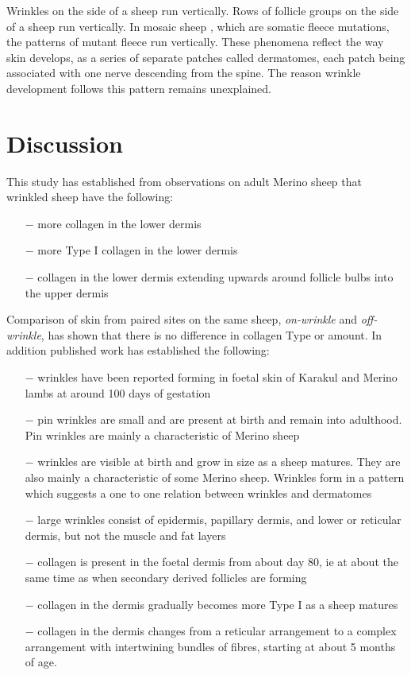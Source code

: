 \documentclass[]{interact}
\theoremstyle{plain}%
\theoremstyle{definition}
\theoremstyle{remark}
\begin{document}
Wrinkles on the side of a sheep run vertically. Rows of follicle groups on the side of a sheep run vertically. In mosaic sheep \citep{fraser-1960}, which are somatic fleece mutations, the patterns of mutant fleece run vertically.  These phenomena reflect the way skin develops, as a series of separate patches called dermatomes, each patch being associated with one nerve descending from the spine. The reason wrinkle development follows this pattern remains unexplained.

\section{Discussion}
This study has established from observations on adult Merino sheep that wrinkled sheep have the following:
\small
\begin{itemize}
\item[$-$] more collagen in the lower dermis
\item[$-$] more Type I collagen in the lower dermis
\item[$-$] collagen in the lower dermis extending upwards around follicle bulbs into the upper dermis
\end{itemize}
\normalsize
Comparison of skin from paired sites on the same sheep,  {\em  on-wrinkle} and {\em off-wrinkle}, has shown that there is no difference in collagen Type or amount.
In addition published work has established the following:
\small
\begin{itemize}
\item[$-$] wrinkles have been reported forming in foetal skin of Karakul and Merino lambs at around 100 days of gestation \citep{bogolyubsky-1940}
\item[$-$] pin wrinkles are small and are present at birth and remain into adulthood. Pin wrinkles are mainly a characteristic of Merino sheep \citep{carter-1943}
\item[$-$] wrinkles are visible at birth and grow in size as a sheep matures. They are also mainly a characteristic of some Merino sheep. Wrinkles form in a pattern which suggests a one to one relation between wrinkles and dermatomes \citep{carter-1943}
\item[$-$] large wrinkles consist of epidermis, papillary dermis, and lower or reticular dermis, but not the muscle and fat layers \cite{mitchell-1984}
\item[$-$] collagen is present in the foetal dermis from about day 80, ie at about the same time as when secondary derived follicles are forming \citep{knight-1993}
\item[$-$] collagen in the dermis gradually becomes more Type I as a sheep matures \citep{knight-1993}
\item[$-$] collagen in the dermis changes from a reticular arrangement to a complex arrangement with intertwining bundles of fibres, starting at about 5 months of age. \citep{kozlowski-1966}
\end{itemize}
\end{document}
